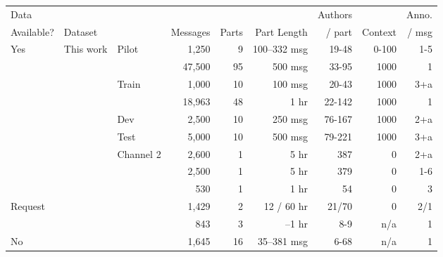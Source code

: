 \documentclass[11pt,a4paper]{article}
\begin{document}
\begin{table*}
    \centering
    \setlength{\tabcolsep}{4pt}
    \begin{tabular}{lllrrrrrr}
        \toprule
        Data         &             &                &          &       &             & Authors &         & Anno. \\
        Available?  &   Dataset   &                & Messages & Parts & Part Length &  / part & Context & / msg \\
        \midrule
        \multirow{9}{*}{Yes}
          & \multirow{7}{*}{This work} & \multicolumn{1}{l|}{Pilot}              &  1,250 &  9 & 100--332 msg &  19-48 & 0-100 & 1-5 \\
          &            & \multicolumn{1}{l|}{}                   & 47,500 & 95 &      500 msg &  33-95 &  1000 &   1 \\[-3pt]
          &            & \multicolumn{1}{l|}{Train \hfill \raisebox{0.4mm}{\hspace{1.4mm}\mbox{------------}\hspace{-1.4mm}}}              &  1,000 & 10 &      100 msg &  20-43 &  1000 & 3+a \\[-3pt]
          &            &                    & 18,963 & 48 &        1  hr & 22-142 &  1000 &   1 \\
          &            & Dev                &  2,500 & 10 &      250 msg & 76-167 &  1000 & 2+a \\
          &            & Test               &  5,000 & 10 &      500 msg & 79-221 &  1000 & 3+a \\
          &            & Channel 2          &  2,600 &  1 &        5  hr &    387 &     0 & 2+a \\[4pt]
          & \multicolumn{2}{l}{\citet{elsner:2008}}                &  2,500 &  1 &        5  hr &    379 &     0 & 1-6 \\
          & \multicolumn{2}{l}{\citet{Mehri:2017:IJCNLP}}          &    530 &  1 &      1\textonehalf\xspace hr &     54 &     0 &   3 \\
        \midrule
        \multirow{2}{*}{Request} &    \multicolumn{2}{l}{\citet{Riou:2015}}                  &  1,429 &  2 &  12 / 60  hr &  21/70 &     0 & 2/1 \\
           & \multicolumn{2}{l}{\citet{Dulceanu:2016}}              &    843 &  3 &  \textonehalf\xspace--1\textonehalf\xspace hr &    8-9 &   n/a &   1 \\
        \midrule
        \multirow{5}{*}{No} &    \multicolumn{2}{l}{\citet{Shen:2006}}              &  1,645 & 16 &  35--381 msg &   6-68 &   n/a &   1 \\

\end{tabular}
\end{table*}
\end{document}
